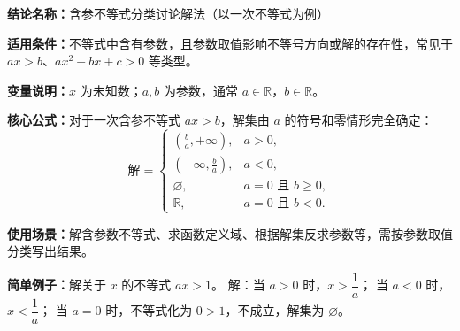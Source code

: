 \textbf{结论名称：}含参不等式分类讨论解法（以一次不等式为例）

\textbf{适用条件：}不等式中含有参数，且参数取值影响不等号方向或解的存在性，常见于 \(ax>b\)、\(ax^2+bx+c>0\) 等类型。

\textbf{变量说明：}\(x\) 为未知数；\(a,b\) 为参数，通常 \(a\in\mathbb{R}\)，\(b\in\mathbb{R}\)。

\textbf{核心公式：}对于一次含参不等式 \(a x > b\)，解集由 \(a\) 的符号和零情形完全确定：
\[
\boxed{
\text{解}=
\begin{cases}
\displaystyle \left(\frac{b}{a},+\infty\right), & a>0,\\[8pt]
\displaystyle \left(-\infty,\frac{b}{a}\right), & a<0,\\[8pt]
\varnothing, & a=0 \text{ 且 } b\ge 0,\\[8pt]
\mathbb{R}, & a=0 \text{ 且 } b<0.
\end{cases}
}
\]

\textbf{使用场景：}解含参数不等式、求函数定义域、根据解集反求参数等，需按参数取值分类写出结果。

\textbf{简单例子：}解关于 \(x\) 的不等式 \(a x > 1\)。
解：当 \(a>0\) 时，\(x > \dfrac{1}{a}\)；
当 \(a<0\) 时，\(x < \dfrac{1}{a}\)；
当 \(a=0\) 时，不等式化为 \(0>1\)，不成立，解集为 \(\varnothing\)。